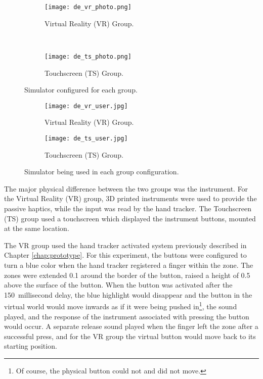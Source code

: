 \begin{figure}
    \centering
    \begin{subfigure}[t]{0.95\linewidth}
        \centering
        \texttt{[image: de\_vr\_photo.png]}
        \caption{Virtual Reality (VR) Group.}
        \label{fig:de_simgroups:vr}
    \end{subfigure}\\
    \begin{subfigure}[t]{0.95\linewidth}
        \centering
        \texttt{[image: de\_ts\_photo.png]}
        \caption{Touchscreen (TS) Group.}
        \label{fig:de_simgroups:ts}
    \end{subfigure}
    \caption{Simulator configured for each group.}
    \label{fig:de_simgroups}
\end{figure}

\begin{figure}
    \centering
    \begin{subfigure}[t]{0.95\linewidth}
        \centering
        \texttt{[image: de\_vr\_user.jpg]}
        \caption{Virtual Reality (VR) Group.}
        \label{fig:de_userpic:vr}
    \end{subfigure}
    \begin{subfigure}[t]{0.95\linewidth}
        \centering
        \texttt{[image: de\_ts\_user.jpg]}
        \caption{Touchscreen (TS) Group.}
        \label{fig:de_userpic:ts}
    \end{subfigure}
    \caption{Simulator being used in each group configuration.}
    \label{fig:de_userpic}
\end{figure}

The major physical difference between the two groups was the instrument.
For the Virtual Reality (VR) group, 3D printed instruments were used to provide the passive haptics, while the input was read by the hand tracker.
The Touchscreen (TS) group used a touchscreen which displayed the instrument buttons, mounted at the same location.

The VR group used the hand tracker activated system previously described in Chapter \ref{chap:prototype}.
For this experiment, the buttons were configured to turn a blue color when the hand tracker registered a finger within the zone.
The zones were extended \SI{0.1}{\inch} around the border of the button, raised a height of \SI{0.5}{\inch} above the surface of the button.
When the button was activated after the 150~millisecond delay, the blue highlight would disappear and the button in the virtual world would move inwards as if it were being pushed in\footnote{Of course, the physical button could not and did not move.}, the sound played, and the response of the instrument associated with pressing the button would occur.
A separate release sound played when the finger left the zone after a successful press, and for the VR group the virtual button would move back to its starting position.

